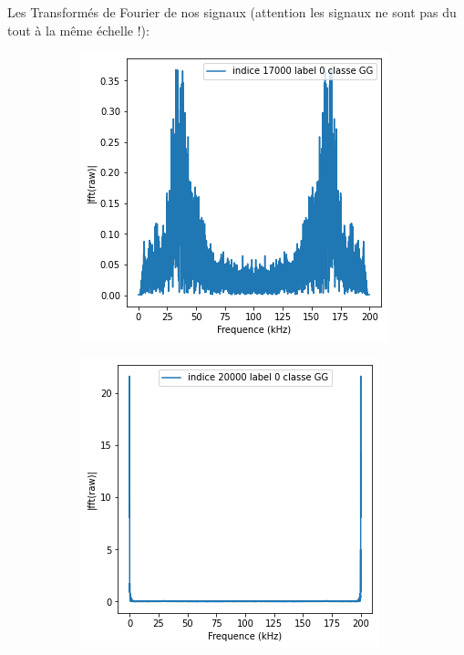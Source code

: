 Les Transformés de Fourier de nos signaux (attention les signaux ne sont pas du tout à la même échelle !):
\begin{figure}[!h]
\centering
  \begin{subfigure}[b]{0.3\textwidth}
    \includegraphics[width=\textwidth]{./images/17000fft.png}
  \end{subfigure}
  \begin{subfigure}[b]{0.3\textwidth}
    \includegraphics[width=\textwidth]{./images/20000fft.png}

\end{subfigure}
\end{figure}

